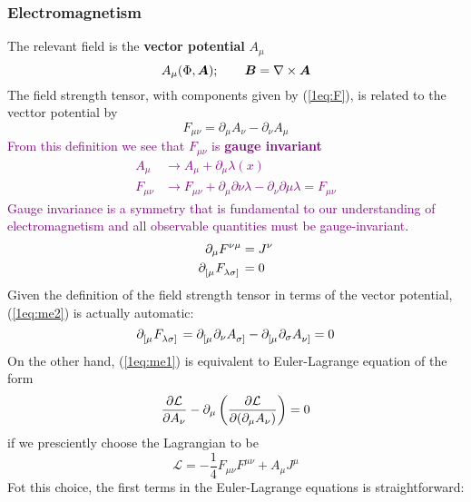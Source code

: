 \subsubsection{Electromagnetism}
The relevant field is the \textbf{vector potential} $A_\mu$
    \begin{equation*}
        A_\mu(\Phi,\vb*{A});\qquad \vb*{B}=\nabla\times\vb*{A}
    \end{equation*}
    The field strength tensor, with components given by (\ref{1eq:F}), is related to the vecttor potential by
    \begin{equation*}
        F_{\mu\nu}=\partial_\mu A_\nu-\partial_\nu A_\mu
    \end{equation*}
    \textcolor{purple}{From this definition we see that $F_{\mu\nu}$ is \textbf{gauge invariant}
    \begin{align*}
        A_\mu &\to A_\mu+\partial_\mu\lambda(x)\\
        F_{\mu\nu}&\to F_{\mu\nu}+\partial_\mu\partial\nu \lambda-\partial_\nu\partial\mu \lambda=F_{\mu\nu}
    \end{align*}
    Gauge invariance is a symmetry that is fundamental to our understanding of electromagnetism and all observable quantities must be gauge-invariant}.
    \begin{align}
       \label{1eq:me1}\partial_\mu F^{\nu\mu}&=J^\nu\\
        \label{1eq:me2}\tensor{\partial}{_{[\mu}}\tensor{F}{_{\lambda\sigma]}}&=0
    \end{align}
    Given the definition of the field strength tensor in terms of the vector potential, (\ref{1eq:me2}) is actually automatic:
    \begin{equation*}
        \tensor{\partial}{_{[\mu}}\tensor{F}{_{\lambda\sigma]}}=\tensor{\partial}{_{[\mu}}\partial_\nu\tensor{A}{_{\sigma]}}-\tensor{\partial}{_{[\mu}}\partial_\sigma\tensor{A}{_{\nu]}}=0
    \end{equation*}
    On the other hand, (\ref{1eq:me1}) is equivalent to Euler-Lagrange equation of the form
    \begin{equation*}
        \pdv{\mathcal{L}}{A_\nu}-\partial_\mu\left(\pdv{\mathcal{L}}{(\partial_\mu A_\nu)}\right)=0
    \end{equation*}
    if we presciently choose the Lagrangian to be
    \begin{equation*}
        \mathcal{L}=-\frac{1}{4}F_{\mu\nu}F^{\mu\nu}+A_\mu J^\mu
    \end{equation*}
    Fot this choice, the first terms in the Euler-Lagrange equations is straightforward:

